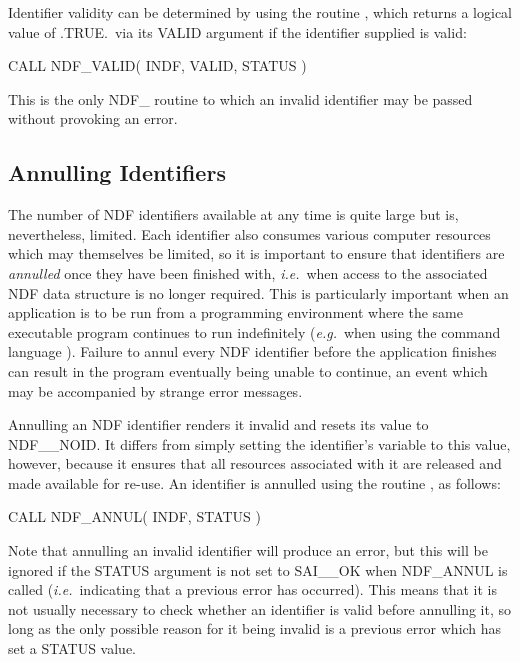 \documentclass[twoside,11pt,nolof]{starlink}
\providecommand{\st}[1]{{\emph{#1}}}
\begin{document}
Identifier validity can be determined by using the routine , which
returns a logical value of .TRUE.\ via its VALID argument if the identifier
supplied is valid:

\small
\begin{terminalv}
      CALL NDF_VALID( INDF, VALID, STATUS )
\end{terminalv}
\normalsize

This is the only NDF\_ routine to which an invalid identifier may be passed
without provoking an error.

\subsection{\label{ss:annul}Annulling Identifiers}

The number of NDF identifiers available at any time is quite large but is,
nevertheless, limited.
Each identifier also consumes various computer resources which may
themselves be limited, so it is important to ensure that identifiers are
\st{annulled\/} once they have been finished with, \st{i.e.}\ when access
to the associated NDF data structure is no longer required.
This is particularly important when an application is to be run from a
programming environment where the same executable program continues to
run indefinitely (\st{e.g.}\ when using the 
command language ).
Failure to annul every NDF identifier before the application finishes
can result in the program eventually being unable to continue, an
event which may be accompanied by strange error messages.

Annulling an NDF identifier renders it invalid and resets its value to
NDF\_\_NOID.
It differs from simply setting the identifier's variable to this value, however,
because it ensures that all resources associated with it are released and made
available for re-use.
An identifier is annulled using the routine , as follows:

\small
\begin{terminalv}
      CALL NDF_ANNUL( INDF, STATUS )
\end{terminalv}
\normalsize

Note that annulling an invalid identifier will produce an error, but this will
be ignored if the STATUS argument is not set to SAI\_\_OK when NDF\_ANNUL is
called (\st{i.e.}\ indicating that a previous error has occurred).
This means that it is not usually necessary to check whether an identifier
is valid before annulling it, so long as the only possible reason for it being
invalid is a previous error which has set a STATUS value.
\end{document}
